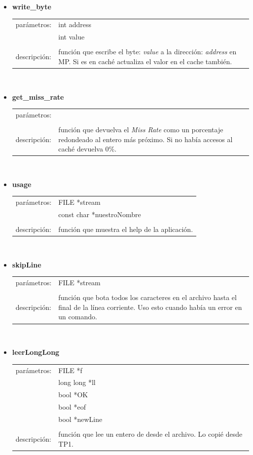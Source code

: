 \documentclass[a4paper]{article}
\begin{document}
\begin{itemize}
\item \textbf{write\_byte}\\
	\begin{tabular}{l p{12cm}}
    parámetros: &int address \\
    			&int value \\
    &\\
    descripción: &función que escribe el byte: \textit{value} a la dirección: \textit{address} en MP. Si es en caché actualiza el valor en el cache también.
    \end{tabular}\\
    
\item \textbf{get\_miss\_rate}\\
	\begin{tabular}{l p{12cm}}
    parámetros: &\\
    &\\
    descripción: &función que devuelva el \textit{Miss Rate} como un porcentaje redondeado al entero más próximo. Si no había accesos al caché devuelva 0\%.
    \end{tabular}\\
    
\item \textbf{usage}\\
	\begin{tabular}{l p{12cm}}
    parámetros: &FILE *stream \\
    			&const char *nuestroNombre\\
    &\\
    descripción: &función que muestra el help de la aplicación.
    \end{tabular}\\

\item \textbf{skipLine}\\
	\begin{tabular}{l p{12cm}}
    parámetros: &FILE *stream \\
    &\\
    descripción: &función que bota todos los caracteres en el archivo hasta el final de la línea corriente. Uso esto cuando había un error en un comando.
    \end{tabular}\\

\item \textbf{leerLongLong}\\
	\begin{tabular}{l p{12cm}}
    parámetros:    &FILE *f\\
                   &long long *ll\\
                   &bool *OK\\
                   &bool *eof\\
                   &bool *newLine\\
	&\\
    descripción: &función que lee un entero de desde el archivo. Lo copié desde TP1.
    \end{tabular}\\
    

\end{itemize}
\end{document}
